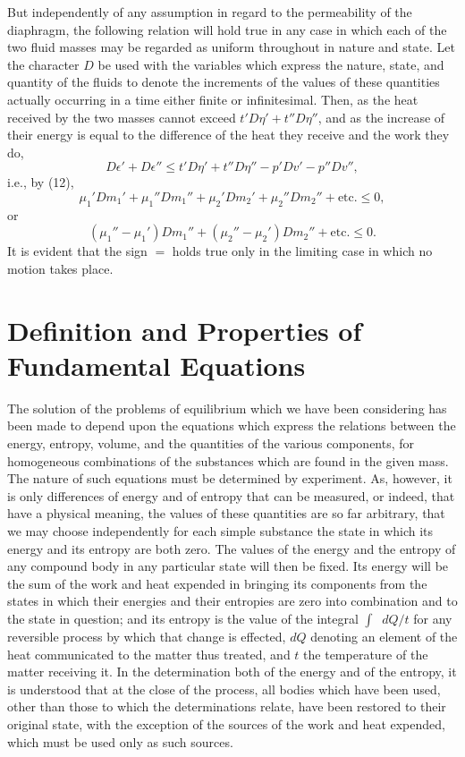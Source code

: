 \documentclass[11pt]{article}
\newcommand{\dd}{\mathop{}\!d}
\newcommand{\eps}{\epsilon}
\begin{document}
But independently of any assumption in regard to the permeability of the diaphragm, the following relation will hold true in any case in which each of the two fluid masses may be regarded as uniform throughout in nature and state. Let the character \(D\) be used with the variables which express the nature, state, and quantity of the fluids to denote the increments of the values of these quantities actually occurring in a time either finite or infinitesimal. Then, as the heat received by the two masses cannot exceed \(t'D\eta' + t''D\eta''\), and as the increase of their energy is equal to the difference of the heat they receive and the work they do,
\begin{equation}
D\eps' + D\eps'' \leq t'D\eta' + t''D\eta'' -p'Dv' -p''Dv'',
\end{equation}
i.e., by (12),
\begin{equation}
\mu_1'Dm_1' + \mu_1''Dm_1'' + \mu_2'Dm_2' + \mu_2''Dm_2''+\text{etc.}\leq 0,
\end{equation}
or
\begin{equation}
(\mu_1''-\mu_1')Dm_1'' + (\mu_2''-\mu_2')Dm_2''+\text{etc.}\leq 0.
\end{equation}
It is evident that the sign \(=\) holds true only in the limiting case in which no motion takes place.

\section*{Definition and Properties of Fundamental Equations}

The solution of the problems of equilibrium which we have been considering has been made to depend upon the equations which express the relations between the energy, entropy, volume, and the quantities of the various components, for homogeneous combinations of the substances which are found in the given mass. The nature of such equations must be determined by experiment. As, however, it is only differences of energy and of entropy that can be measured, or indeed, that have a physical meaning, the values of these quantities are so far arbitrary, that we may choose independently for each simple substance the state in which its energy and its entropy are both zero. The values of the energy and the entropy of any compound body in any particular state will then be fixed. Its energy will be the sum of the work and heat expended in bringing its components from the states in which their energies and their entropies are zero into combination and to the state in question; and its entropy is the value of the integral \(\int \dd Q/t\) for any reversible process by which that change is effected, \(dQ\) denoting an element of the heat communicated to the matter thus treated, and \(t\) the temperature of the matter receiving it. In the determination both of the energy and of the entropy, it is understood that at the close of the process, all bodies which have been used, other than those to which the determinations relate, have been restored to their original state, with the exception of the sources of the work and heat expended, which must be used only as such sources.
\end{document}
